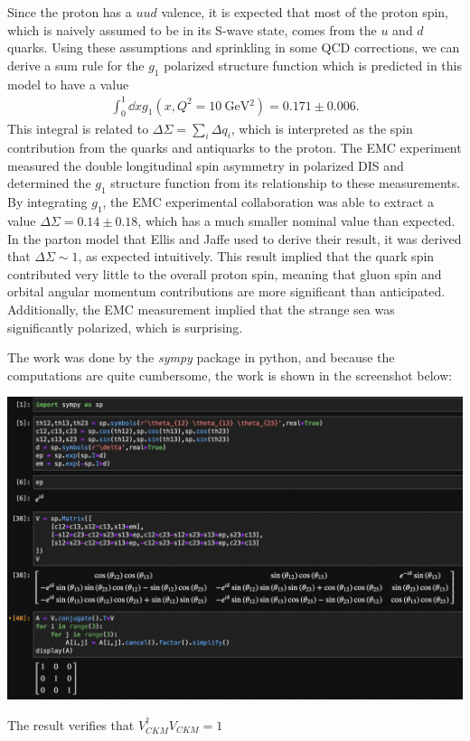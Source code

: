 Since the proton has a $uud$ valence, it is expected that most of the proton spin, which is naively assumed to be in its S-wave state, comes from the $u$ and $d$ quarks.
Using these assumptions and sprinkling in some QCD corrections, we can derive a sum rule for the $g_{1}$ polarized structure function which is predicted in this model to have a value
\begin{eqnarray}
    \int_{0}^{1} \dd{x} g_{1}(x,Q^2=\SI{10}{\GeV^2}) = 0.171 \pm 0.006
.\end{eqnarray}
This integral is related to $\Delta \Sigma = \sum_{i} \Delta q_{i}$, which is interpreted as the spin contribution from the quarks and antiquarks to the proton.
The EMC experiment measured the double longitudinal spin asymmetry in polarized DIS and determined the $g_1$ structure function from its relationship to these measurements.
By integrating $g_1$, the EMC experimental collaboration was able to extract a value $\Delta \Sigma = 0.14 \pm 0.18$, which has a much smaller nominal value than expected.
In the parton model that Ellis and Jaffe used to derive their result, it was derived that $\Delta \Sigma \sim 1$, as expected intuitively.
This result implied that the quark spin contributed very little to the overall proton spin, meaning that gluon spin and orbital angular momentum contributions are more significant than anticipated.
Additionally, the EMC measurement implied that the strange sea was significantly polarized, which is surprising.


The work was done by the \textit{sympy} package in python, and because the computations are quite cumbersome, the work is shown in the screenshot below:
\begin{center}
    \includegraphics[width=\textwidth]{./prob7.png}
\end{center}
The result verifies that $V_{CKM}^{\dagger}V_{CKM} = 1$




